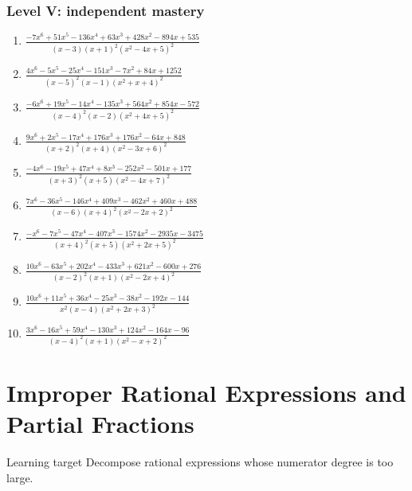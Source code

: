 \documentclass[11pt,oneside]{book}
\begin{document}
\subsection*{Level V: independent mastery}
\begin{enumerate}[leftmargin=*,label=\textbf{\arabic*.},itemsep=0.65\baselineskip]
\item $\displaystyle \frac{- 7 x^{6} + 51 x^{5} - 136 x^{4} + 63 x^{3} + 428 x^{2} - 894 x + 535}{\left(x - 3\right) \left(x + 1\right)^{2} \left(x^{2} - 4 x + 5\right)^{2}}$
\item $\displaystyle \frac{4 x^{6} - 5 x^{5} - 25 x^{4} - 151 x^{3} - 7 x^{2} + 84 x + 1252}{\left(x - 5\right)^{2} \left(x - 1\right) \left(x^{2} + x + 4\right)^{2}}$
\item $\displaystyle \frac{- 6 x^{6} + 19 x^{5} - 14 x^{4} - 135 x^{3} + 564 x^{2} + 854 x - 572}{\left(x - 4\right)^{2} \left(x - 2\right) \left(x^{2} + 4 x + 5\right)^{2}}$
\item $\displaystyle \frac{9 x^{6} + 2 x^{5} - 17 x^{4} + 176 x^{3} + 176 x^{2} - 64 x + 848}{\left(x + 2\right)^{2} \left(x + 4\right) \left(x^{2} - 3 x + 6\right)^{2}}$
\item $\displaystyle \frac{- 4 x^{6} - 19 x^{5} + 47 x^{4} + 8 x^{3} - 252 x^{2} - 501 x + 177}{\left(x + 3\right)^{2} \left(x + 5\right) \left(x^{2} - 4 x + 7\right)^{2}}$
\item $\displaystyle \frac{7 x^{6} - 36 x^{5} - 146 x^{4} + 409 x^{3} - 462 x^{2} + 460 x + 488}{\left(x - 6\right) \left(x + 4\right)^{2} \left(x^{2} - 2 x + 2\right)^{2}}$
\item $\displaystyle \frac{- x^{6} - 7 x^{5} - 47 x^{4} - 407 x^{3} - 1574 x^{2} - 2935 x - 3475}{\left(x + 4\right)^{2} \left(x + 5\right) \left(x^{2} + 2 x + 5\right)^{2}}$
\item $\displaystyle \frac{10 x^{6} - 63 x^{5} + 202 x^{4} - 433 x^{3} + 621 x^{2} - 600 x + 276}{\left(x - 2\right)^{2} \left(x + 1\right) \left(x^{2} - 2 x + 4\right)^{2}}$
\item $\displaystyle \frac{10 x^{6} + 11 x^{5} + 36 x^{4} - 25 x^{3} - 38 x^{2} - 192 x - 144}{x^{2} \left(x - 4\right) \left(x^{2} + 2 x + 3\right)^{2}}$
\item $\displaystyle \frac{3 x^{6} - 16 x^{5} + 59 x^{4} - 130 x^{3} + 124 x^{2} - 164 x - 96}{\left(x - 4\right)^{2} \left(x + 1\right) \left(x^{2} - x + 2\right)^{2}}$
\end{enumerate}
\chapter{Improper Rational Expressions and Partial Fractions}
\begin{rulebox}{Learning target}
Decompose rational expressions whose numerator degree is too large.
\end{rulebox}
\end{document}
